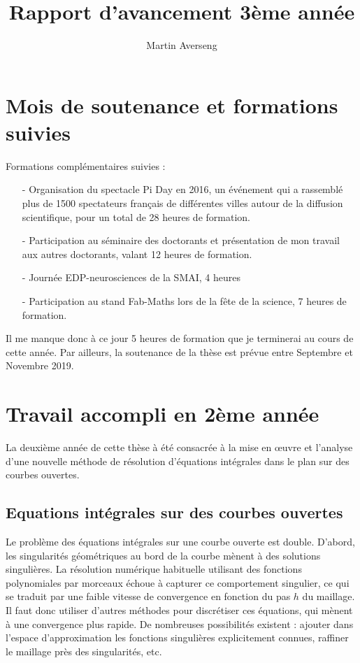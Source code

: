 \documentclass[utf8]{article}
\title{Rapport d'avancement 3ème année}
\author{Martin Averseng}
\begin{document}
	\maketitle
	
	\section{Mois de soutenance et formations suivies}
	
	Formations complémentaires suivies : 
	\begin{itemize}
		\item[-] Organisation du spectacle Pi Day en 2016, un événement qui a rassemblé plus de 1500 spectateurs français de différentes villes autour de la diffusion scientifique, pour un total de 28 heures de formation.
		\item[-] Participation au séminaire des doctorants et présentation de mon travail aux autres doctorants, valant 12 heures de formation. 
		\item[-] Journée EDP-neurosciences de la SMAI, 4 heures
		\item[-] Participation au stand Fab-Maths lors de la fête de la science, 7 heures de formation.  
	\end{itemize}
	
	Il me manque donc à ce jour 5 heures de formation que je terminerai au cours de cette année. Par ailleurs, la soutenance de la thèse est prévue entre Septembre et Novembre 2019. 
	
	\section{Travail accompli en 2ème année}
	
	La deuxième année de cette thèse à été consacrée à la mise en œuvre et l'analyse d'une nouvelle méthode de résolution d'équations intégrales dans le plan sur des courbes ouvertes.
	
	\subsection{Equations intégrales sur des courbes ouvertes}
	
	Le problème des équations intégrales sur une courbe ouverte est double. D'abord, les singularités géométriques au bord de la courbe mènent à des solutions singulières. La résolution numérique habituelle utilisant des fonctions polynomiales par morceaux échoue à capturer ce comportement singulier, ce qui se traduit par une faible vitesse de convergence en fonction du pas $h$ du maillage. Il faut donc utiliser d'autres méthodes pour discrétiser ces équations, qui mènent à une convergence plus rapide. De nombreuses possibilités existent : ajouter dans l'espace d'approximation les fonctions singulières explicitement connues, raffiner le maillage près des singularités, etc.
	
\end{document}
